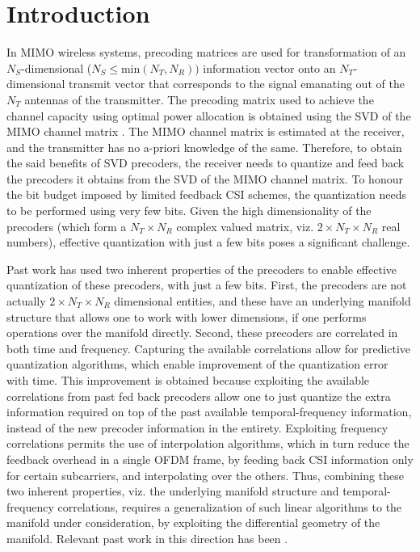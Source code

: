 \documentclass[conference]{IEEEtran}
\begin{document}
\section{Introduction}
\label{intro}
In MIMO wireless systems, precoding matrices are used for transformation of an $N_S$-dimensional ($N_S \leq \text{min}(N_T,N_R))$ information vector onto an $N_T$-dimensional transmit vector that corresponds to the signal emanating out of the $N_T$ antennas of the transmitter.
The precoding matrix used to achieve the channel capacity using optimal power allocation is obtained using the SVD of the MIMO channel matrix \cite{love2008overview}.
The MIMO channel matrix is estimated at the receiver, and the transmitter has no a-priori knowledge of the same.
Therefore, to obtain the said benefits of SVD precoders, the receiver needs to quantize and feed back the precoders it obtains from the SVD of the MIMO channel matrix.
To honour the bit budget imposed by limited feedback CSI schemes, the quantization needs to be performed using very few bits.
Given the high dimensionality of the precoders (which form a $N_T \times N_R$ complex valued matrix, viz. $2\times N_T\times N_R$ real numbers), effective quantization with just a few bits poses a significant challenge.

Past work has used two inherent properties of the precoders to enable effective quantization of these precoders, with just a few bits.
First, the precoders are not actually $2\times N_T\times N_R$ dimensional entities, and these have an underlying manifold structure that allows one to work with lower dimensions, if one performs operations over the manifold directly.
Second, these precoders are correlated in both time and frequency.
Capturing the available correlations allow for predictive quantization algorithms, which enable improvement of the quantization error with time.
This improvement is obtained because exploiting the available correlations from past fed back precoders allow one to just quantize the extra information required on top of the past available temporal-frequency information, instead of the new precoder information in the entirety.
Exploiting frequency correlations permits the use of interpolation algorithms, which in turn reduce the feedback overhead in a single OFDM frame, by feeding back CSI information only for certain subcarriers, and interpolating over the others.
Thus, combining these two inherent properties, viz. the underlying manifold structure and temporal-frequency correlations, requires a generalization of such linear algorithms to the manifold under consideration, by exploiting the differential geometry of the manifold. Relevant past work in this direction has been \cite{Gupt1905:Predictive,6891198,6545375,5671092,Li2016,khaled2005quantized,krishnamachari2013geometry}.
\end{document}
